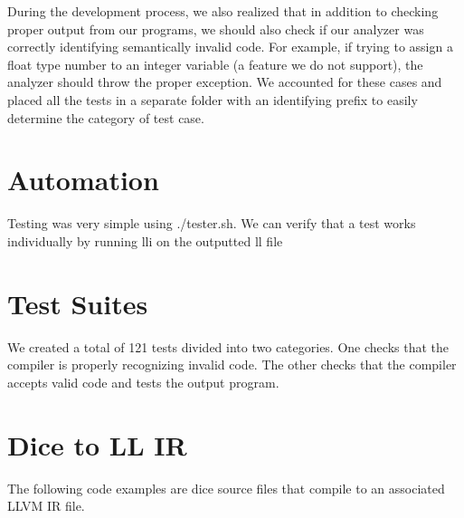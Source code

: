 \begin{homeworkProblem}
	During the development process, we also realized that in addition to checking proper output from our programs, we should also check if our analyzer was correctly identifying semantically invalid code. For example, if trying to assign a float type number to an integer variable (a feature we do not support), the analyzer should throw the proper exception. We accounted for these cases and placed all the tests in a separate folder with an identifying prefix to easily determine the category of test case.
	\section{Automation}
	Testing was very simple using ./tester.sh. We can verify that a test works individually by running lli on the outputted ll file
	\section{Test Suites}
	We created a total of 121 tests divided into two categories. One checks that the compiler is properly recognizing invalid code. The other checks that the compiler accepts valid code and tests the output program. 
	
	\section{Dice to LL IR}
	The following code examples are dice source files that compile to an associated LLVM IR file. 
	
	
	\pagebreak
	
	\pagebreak
	

\end{homeworkProblem}